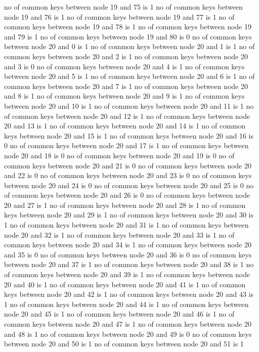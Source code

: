 no of common keys between node 19 and 75 is 1
no of common keys between node 19 and 76 is 1
no of common keys between node 19 and 77 is 1
no of common keys between node 19 and 78 is 1
no of common keys between node 19 and 79 is 1
no of common keys between node 19 and 80 is 0
no of common keys between node 20 and 0 is 1
no of common keys between node 20 and 1 is 1
no of common keys between node 20 and 2 is 1
no of common keys between node 20 and 3 is 0
no of common keys between node 20 and 4 is 1
no of common keys between node 20 and 5 is 1
no of common keys between node 20 and 6 is 1
no of common keys between node 20 and 7 is 1
no of common keys between node 20 and 8 is 1
no of common keys between node 20 and 9 is 1
no of common keys between node 20 and 10 is 1
no of common keys between node 20 and 11 is 1
no of common keys between node 20 and 12 is 1
no of common keys between node 20 and 13 is 1
no of common keys between node 20 and 14 is 1
no of common keys between node 20 and 15 is 1
no of common keys between node 20 and 16 is 0
no of common keys between node 20 and 17 is 1
no of common keys between node 20 and 18 is 0
no of common keys between node 20 and 19 is 0
no of common keys between node 20 and 21 is 0
no of common keys between node 20 and 22 is 0
no of common keys between node 20 and 23 is 0
no of common keys between node 20 and 24 is 0
no of common keys between node 20 and 25 is 0
no of common keys between node 20 and 26 is 0
no of common keys between node 20 and 27 is 1
no of common keys between node 20 and 28 is 1
no of common keys between node 20 and 29 is 1
no of common keys between node 20 and 30 is 1
no of common keys between node 20 and 31 is 1
no of common keys between node 20 and 32 is 1
no of common keys between node 20 and 33 is 1
no of common keys between node 20 and 34 is 1
no of common keys between node 20 and 35 is 0
no of common keys between node 20 and 36 is 0
no of common keys between node 20 and 37 is 1
no of common keys between node 20 and 38 is 1
no of common keys between node 20 and 39 is 1
no of common keys between node 20 and 40 is 1
no of common keys between node 20 and 41 is 1
no of common keys between node 20 and 42 is 1
no of common keys between node 20 and 43 is 1
no of common keys between node 20 and 44 is 1
no of common keys between node 20 and 45 is 1
no of common keys between node 20 and 46 is 1
no of common keys between node 20 and 47 is 1
no of common keys between node 20 and 48 is 1
no of common keys between node 20 and 49 is 0
no of common keys between node 20 and 50 is 1
no of common keys between node 20 and 51 is 1

